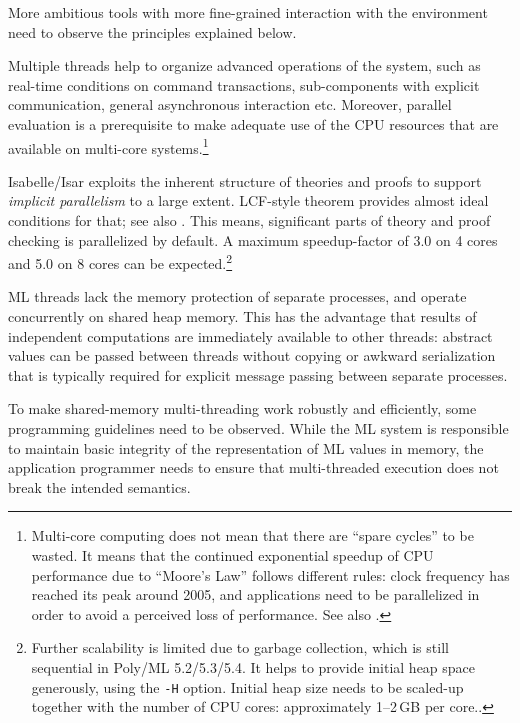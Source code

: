 \begin{isabellebody}
\begin{isamarkuptext}
  More ambitious tools with more fine-grained interaction with the
  environment need to observe the principles explained below.%
\end{isamarkuptext}%
\isamarkuptrue%
%
\isamarkuptrue%
%
\begin{isamarkuptext}%
Multiple threads help to organize advanced operations of the
  system, such as real-time conditions on command transactions,
  sub-components with explicit communication, general asynchronous
  interaction etc.  Moreover, parallel evaluation is a prerequisite to
  make adequate use of the CPU resources that are available on
  multi-core systems.\footnote{Multi-core computing does not mean that
  there are ``spare cycles'' to be wasted.  It means that the
  continued exponential speedup of CPU performance due to ``Moore's
  Law'' follows different rules: clock frequency has reached its peak
  around 2005, and applications need to be parallelized in order to
  avoid a perceived loss of performance.  See also
  \cite{Sutter:2005}.}

  Isabelle/Isar exploits the inherent structure of theories and proofs
  to support \emph{implicit parallelism} to a large extent.  LCF-style
  theorem provides almost ideal conditions for that; see also
  \cite{Wenzel:2009}.  This means, significant parts of theory and
  proof checking is parallelized by default.  A maximum speedup-factor
  of 3.0 on 4 cores and 5.0 on 8 cores can be
  expected.\footnote{Further scalability is limited due to garbage
  collection, which is still sequential in Poly/ML 5.2/5.3/5.4.  It
  helps to provide initial heap space generously, using the
  \texttt{-H} option.  Initial heap size needs to be scaled-up
  together with the number of CPU cores: approximately 1--2\,GB per
  core..}

  \medskip ML threads lack the memory protection of separate
  processes, and operate concurrently on shared heap memory.  This has
  the advantage that results of independent computations are
  immediately available to other threads: abstract values can be
  passed between threads without copying or awkward serialization that
  is typically required for explicit message passing between separate
  processes.

  To make shared-memory multi-threading work robustly and efficiently,
  some programming guidelines need to be observed.  While the ML
  system is responsible to maintain basic integrity of the
  representation of ML values in memory, the application programmer
  needs to ensure that multi-threaded execution does not break the
  intended semantics.


\end{isamarkuptext}
\end{isabellebody}
